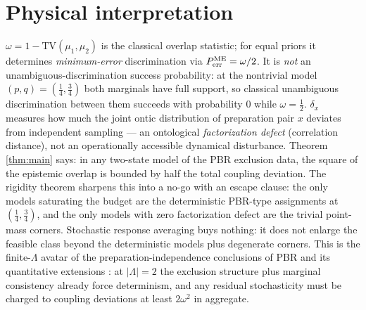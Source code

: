 \documentclass[11pt,a4paper]{article}
\newcommand{\dd}{\delta}
\begin{document}
\section{Physical interpretation}
\label{sec:phys}
$\omega=1-\mathrm{TV}(\mu_1,\mu_2)$ is the classical overlap statistic; for equal priors it determines \emph{minimum-error} discrimination via $P^{\rm ME}_{\rm err}=\omega/2$. It is \emph{not} an unambiguous-discrimination success probability: at the nontrivial model $(p,q)=(\tfrac14,\tfrac34)$ both marginals have full support, so classical unambiguous discrimination between them succeeds with probability $0$ while $\omega=\tfrac12$. $\dd_x$ measures how much the joint ontic distribution of preparation pair $x$ deviates from independent sampling --- an ontological \emph{factorization defect} (correlation distance), not an operationally accessible dynamical disturbance. Theorem \ref{thm:main} says: in any two-state model of the PBR exclusion data, the square of the epistemic overlap is bounded by half the total coupling deviation. The rigidity theorem sharpens this into a no-go with an escape clause: the only models saturating the budget are the deterministic PBR-type assignments at $(\tfrac14,\tfrac34)$, and the only models with zero factorization defect are the trivial point-mass corners. Stochastic response averaging buys nothing: it does not enlarge the feasible class beyond the deterministic models plus degenerate corners. This is the finite-$\Lambda$ avatar of the preparation-independence conclusions of PBR and its quantitative extensions \cite{pbr,branciard,mansfield,ks2}: at $|\Lambda|=2$ the exclusion structure plus marginal consistency already force determinism, and any residual stochasticity must be charged to coupling deviations at least $2\omega^2$ in aggregate.
\end{document}
